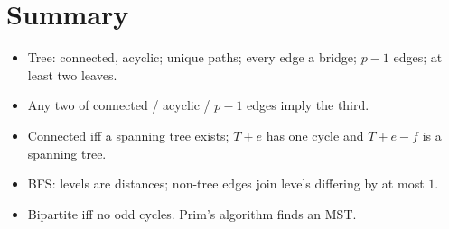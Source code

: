 \section{Summary}
\begin{itemize}
  \item Tree: connected, acyclic; unique paths; every edge a bridge; $p - 1$ edges; at least two leaves.
  \item Any two of connected / acyclic / $p-1$ edges imply the third.
  \item Connected iff a spanning tree exists; $T + e$ has one cycle and $T + e - f$ is a spanning tree.
  \item BFS: levels are distances; non-tree edges join levels differing by at most $1$.
  \item Bipartite iff no odd cycles. Prim's algorithm finds an MST.
\end{itemize}
